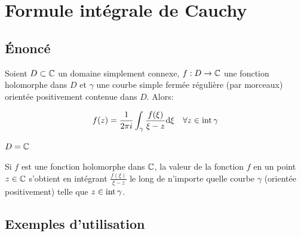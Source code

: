\section{Formule intégrale de Cauchy}

\subsection{Énoncé}

\begin{theorem}
    Soient $D \subset \mathbb{C}$ un domaine simplement connexe, $f: D \rightarrow \mathbb{C}$ une fonction holomorphe dans $D$ et $\gamma$ une courbe simple fermée régulière (par morceaux) orientée positivement contenue dans $D$.
    Alors:
    
    \[
    f(z) = \frac{1}{2 \pi i} \int_\gamma \frac{f(\xi)}{\xi - z} \mathrm{d}\xi \quad \forall z \in \textrm{int}\, \gamma
    \]
\end{theorem}

\begin{illustration}
    $D = \mathbb{C}$
    
    Si $f$ est une fonction holomorphe dans $\mathbb{C}$, la valeur de la fonction $f$ en un point $z \in \mathbb{C}$ s'obtient en intégrant $\frac{f(\xi)}{\xi - z}$ le long de n'importe quelle courbe $\gamma$ (orientée positivement) telle que $z \in \textrm{int}\, \gamma$.
\end{illustration}

\subsection{Exemples d'utilisation}

